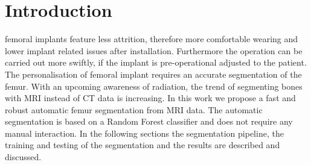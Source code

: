 \section{Introduction}
 femoral implants feature less attrition, therefore more comfortable wearing and lower implant related issues after installation. Furthermore the operation can be carried out more swiftly, if the implant is pre-operational adjusted to the patient. The personalisation of femoral implant requires an accurate segmentation of the femur. With an upcoming awareness of radiation, the trend of segmenting bones with MRI instead of CT data is increasing.
In this work we propose a fast and robust automatic femur segmentation from MRI data. The automatic segmentation is based on a Random Forest classifier and does not require any manual interaction. In the following sections the segmentation pipeline, the training and testing of the segmentation and the results are described and discussed.

